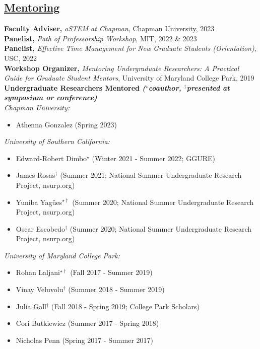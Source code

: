 \documentclass[]{res}
\begin{document}
\begin{resume}
\section{\underline{Mentoring}} \vspace{2mm}
{\bf Faculty Adviser,} \emph{oSTEM at Chapman}, Chapman University, 2023\\
{\bf Panelist,} \emph{Path of Professorship Workshop}, MIT, 2022 \& 2023\\
{\bf Panelist,} \emph{Effective Time Management for New Graduate Students (Orientation)}, USC, 2022\\
{\bf Workshop Organizer,} \emph{Mentoring Undergraduate Researchers: A Practical Guide for Graduate Student Mentors}, University of Maryland College Park, 2019\\
{\bf Undergraduate Researchers Mentored \emph{\footnotesize{($^{\star}$coauthor, $^{\dagger}$presented at symposium or conference)}}} \\
\emph{Chapman University:}
\begin{itemize}[leftmargin=*]
\item[] Athenna Gonzalez (Spring 2023)
\end{itemize}
\emph{University of Southern California:}
\begin{itemize}[leftmargin=*]
\item[] Edward-Robert Dimbo$^{\star}$ (Winter 2021 - Summer 2022; GGURE)
\item[] James Rosas$^{\dagger}$ (Summer 2021; National Summer Undergraduate Research Project, nsurp.org)
\item[] Yuniba Yag{\"u}es$^{\star\dagger}$ (Summer 2020; National Summer Undergraduate Research Project, nsurp.org)
\item[] Oscar Escobedo$^{\dagger}$ (Summer 2020; National Summer Undergraduate Research Project, nsurp.org)
\end{itemize}
\vspace{1mm}
\emph{University of Maryland College Park:}
\begin{itemize}[leftmargin=*]
\item[] Rohan Laljani$^{\star\dagger}$ (Fall 2017 - Summer 2019)
\item[] Vinay Veluvolu$^{\dagger}$ (Summer 2018 - Summer 2019)
\item[] Julia Gall$^{\dagger}$ (Fall 2018 - Spring 2019; College Park Scholars)
\item[] Cori Butkiewicz (Summer 2017 - Spring 2018)
\item[] Nicholas Penn (Spring 2017 - Summer 2017)
\end{itemize}



\end{resume}
\end{document}
